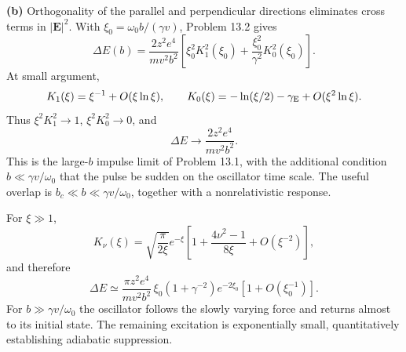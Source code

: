\textbf{(b)} Orthogonality of the parallel and perpendicular directions
eliminates cross terms in $|\mathbf E|^2$. With
$\xi_0=\omega_0b/(\gamma v)$, Problem 13.2 gives
\[
 \boxed{\Delta E(b)=\frac{2z^2e^4}{mv^2b^2}
 \left[\xi_0^2K_1^2(\xi_0)
      +\frac{\xi_0^2}{\gamma^2}K_0^2(\xi_0)\right].}
\]
At small argument,
\[
 K_1(\xi)=\xi^{-1}+O(\xi\ln\xi),\qquad
 K_0(\xi)=-\ln(\xi/2)-\gamma_{\rm E}
           +O(\xi^2\ln\xi).
\]
Thus $\xi^2K_1^2\to1$, $\xi^2K_0^2\to0$, and
\[
 \Delta E\longrightarrow\frac{2z^2e^4}{mv^2b^2}.
\]
This is the large-$b$ impulse limit of Problem 13.1, with the additional
condition $b\ll\gamma v/\omega_0$ that the pulse be sudden on the
oscillator time scale. The useful overlap is
$b_c\ll b\ll\gamma v/\omega_0$, together with a nonrelativistic response.

For $\xi\gg1$,
\[
 K_\nu(\xi)=\sqrt{\frac{\pi}{2\xi}}e^{-\xi}
 \left[1+\frac{4\nu^2-1}{8\xi}+O(\xi^{-2})\right],
\]
and therefore
\[
 \Delta E\simeq\frac{\pi z^2e^4}{mv^2b^2}\,
 \xi_0(1+\gamma^{-2})e^{-2\xi_0}
 \left[1+O(\xi_0^{-1})\right].
\]
For $b\gg\gamma v/\omega_0$ the oscillator follows the slowly varying
force and returns almost to its initial state. The remaining excitation
is exponentially small, quantitatively establishing adiabatic suppression.









